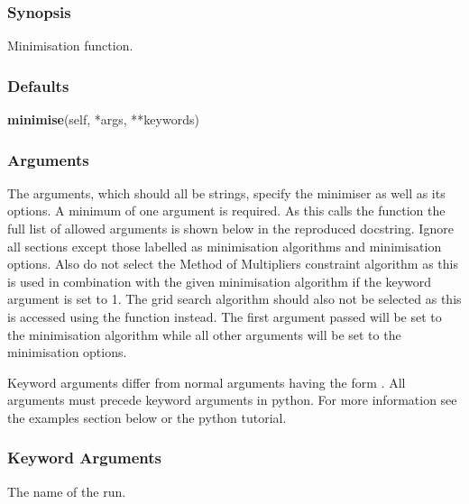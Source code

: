   
 \subsubsection{Synopsis} 

 Minimisation function. 
  

  
 \subsubsection{Defaults} 

 \textsf{\textbf{minimise}(self, *args, **keywords)} 

  
 \subsubsection{Arguments} 

 The arguments, which should all be strings, specify the minimiser as well as its options.  A minimum of one argument is required.  As this calls the function  the full list of allowed arguments is shown below in the reproduced  docstring. Ignore all sections except those labelled as minimisation algorithms and minimisation options.  Also do not select the Method of Multipliers constraint algorithm as this is used in combination with the given minimisation algorithm if the keyword argument  is set to 1.  The grid search algorithm should also not be selected as this is accessed using the  function instead.  The first argument passed will be set to the minimisation algorithm while all other arguments will be set to the minimisation options. 
  

 Keyword arguments differ from normal arguments having the form .  All arguments must precede keyword arguments in python.  For more information see the examples section below or the python tutorial. 
  

  
 \subsubsection{Keyword Arguments} 

   The name of the run.   

